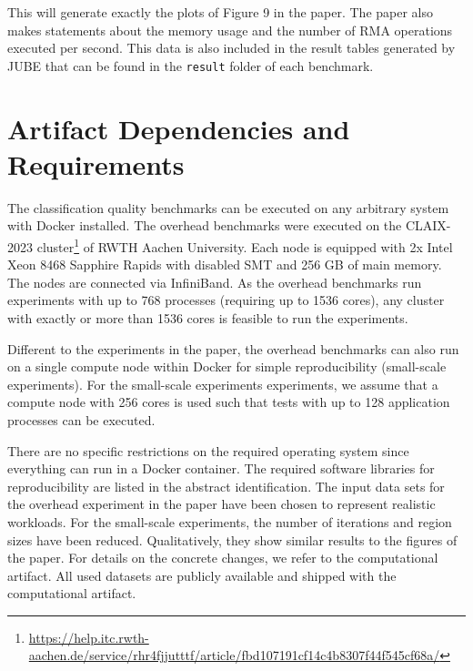 \documentclass[twoside]{article}
\begin{document}
This will generate exactly the plots of Figure 9 in the paper. The paper also makes statements about the memory usage and the number of RMA operations executed per second. This data is also included in the result tables generated by JUBE that can be found in the \texttt{result} folder of each benchmark.



\section*{Artifact Dependencies and Requirements}
The classification quality benchmarks can be executed on any arbitrary system with Docker installed.
The overhead benchmarks were executed on the CLAIX-2023 cluster\footnote{\url{https://help.itc.rwth-aachen.de/service/rhr4fjjutttf/article/fbd107191cf14c4b8307f44f545cf68a/}} of RWTH Aachen University. Each node is equipped with 2x Intel Xeon 8468 Sapphire Rapids with disabled SMT and 256 GB of main memory. The nodes are connected via InfiniBand. As the overhead benchmarks run experiments with up to 768 processes (requiring up to 1536 cores), any cluster with exactly or more than 1536 cores is feasible to run the experiments.

Different to the experiments in the paper, the overhead benchmarks can also run on a single compute node within Docker for simple reproducibility (small-scale experiments).
For the small-scale experiments experiments, we assume that a compute node with 256 cores is used such that tests with up to 128 application processes can be executed.

There are no specific restrictions on the required operating system since everything can run in a Docker container. The required software libraries for reproducibility are listed in the abstract identification.
The input data sets for the overhead experiment in the paper have been chosen to represent realistic workloads.
For the small-scale experiments, the number of iterations and region sizes have been reduced.
Qualitatively, they show similar results to the figures of the paper.
For details on the concrete changes, we refer to the computational artifact.
All used datasets are publicly available and shipped with the computational artifact.
\end{document}
